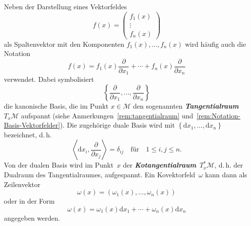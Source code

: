 Neben der Darstellung eines Vektorfeldes
\[
f(x)=\left(\begin{array}{c}
f_{1}(x)\\
\vdots\\
f_{n}(x)
\end{array}\right)
\]
als Spaltenvektor mit den Komponenten $f_{1}(x),\ldots,f_{n}(x)$
wird häufig auch die Notation
\begin{equation}
f(x)=f_{1}(x)\frac{\partial}{\partial x_{1}}+\cdots+f_{n}(x)\frac{\partial}{\partial x_{n}}\label{eq:Basisdarstellung-Vektorfelder}
\end{equation}
verwendet.
Dabei symbolisiert
\begin{equation}
\left\{ \frac{\partial}{\partial x_{1}},\ldots,\frac{\partial}{\partial x_{n}}\right\} \label{eq:Basisvektorfelder}
\end{equation}
die kanonische Basis, die im Punkt $x\in\mathcal{M}$ den sogenannten
\textbf{\em Tangential\-raum}~$T_{x}\mathcal{M}$
aufspannt (siehe Anmerkungen~\ref{rem:tangentialraum} und~\ref{rem:Notation-Basis-Vektorfelder}).
Die zugehörige duale Basis wird mit $\left\{ {\mathrm{d}} x_{1},\dots,{\mathrm{d}} x_{n}\right\} $
bezeichnet, d.\,h.
\[
\left\langle {\mathrm{d}} x_{i},\frac{\partial}{\partial x_{j}}\right\rangle =\delta_{ij}\quad\textrm{für}\quad1\leq i,j\leq n.
\]
Von der dualen Basis wird im Punkt~$x$ der \textbf{\em Kotangential\-raum}~$T_{x}^{*}\mathcal{M}$,
d.\,h. der Dualraum des Tangentialraumes, aufgespannt.
Ein Kovektorfeld~$\omega$
kann dann als Zeilenvektor
\[
\omega(x)=\left(\omega_{1}(x),\ldots,\omega_{n}(x)\right)
\]
oder in der Form
\begin{equation}
\omega(x)=\omega_{1}(x){\mathrm{d}} x_{1}+\cdots+\omega_{n}(x){\mathrm{d}} x_{n}\label{eq:Basisdarstellung-Kovektorfelder}
\end{equation}
angegeben werden.
